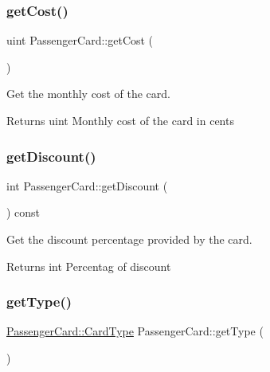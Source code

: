 \subsubsection{\texorpdfstring{get\+Cost()}{getCost()}}
{\footnotesize\ttfamily uint Passenger\+Card\+::get\+Cost (\begin{DoxyParamCaption}{ }\end{DoxyParamCaption})}



Get the monthly cost of the card. 

\begin{DoxyReturn}{Returns}
uint Monthly cost of the card in cents 
\end{DoxyReturn}
\mbox{\label{classPassengerCard_a62d2651d233d28643d5e0863500c42c4}} 
\subsubsection{\texorpdfstring{get\+Discount()}{getDiscount()}}
{\footnotesize\ttfamily int Passenger\+Card\+::get\+Discount (\begin{DoxyParamCaption}{ }\end{DoxyParamCaption}) const}



Get the discount percentage provided by the card. 

\begin{DoxyReturn}{Returns}
int Percentag of discount 
\end{DoxyReturn}
\mbox{\label{classPassengerCard_aef682e4bb625ac937c4aec7999c92626}} 
\subsubsection{\texorpdfstring{get\+Type()}{getType()}}
{\footnotesize\ttfamily \mbox{\hyperlink{classPassengerCard_ac30388c823af514403463a797e2878af}{Passenger\+Card\+::\+Card\+Type}} Passenger\+Card\+::get\+Type (\begin{DoxyParamCaption}{ }\end{DoxyParamCaption})}



